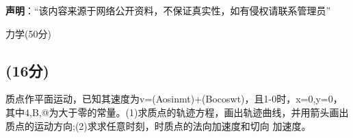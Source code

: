 
\textbf{声明}：“该内容来源于网络公开资料，不保证真实性，如有侵权请联系管理员”

力学(50分)
\subsection{(16分)}
质点作平面运动，已知其速度为v=(Aosinmt)+(Bocoswt)，且1-0时，x=0,y=0，其中4,B,@为大于零的常量。(1)求质点的轨迹方程，画出轨迹曲线，并用箭头画出质点的运动方向;(2)求求任意时刻，时质点的法向加速度和切向
加速度。